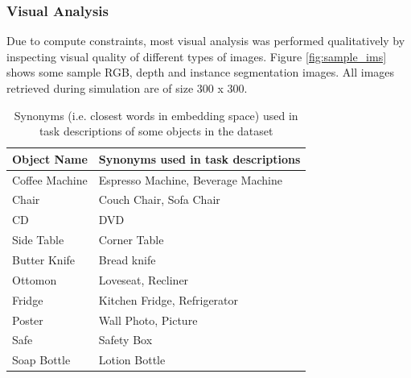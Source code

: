 \documentclass[11pt,a4paper]{article}
\begin{document}
\subsubsection{Visual Analysis}
Due to compute constraints, most visual analysis was performed qualitatively by inspecting visual quality of different types of images. Figure \ref{fig:sample_ims} shows some sample RGB, depth and instance segmentation images. All images retrieved during simulation are of size 300 x 300.



\begin{table}[H]
\small
\begin{tabular}{@{}ll@{}}
\toprule
Object Name & Synonyms used in task descriptions  \\ \midrule
Coffee Machine & Espresso Machine, Beverage Machine \\
Chair & Couch Chair, Sofa Chair \\
CD   & DVD \\
Side Table & Corner Table \\
Butter Knife & Bread knife \\
Ottomon & Loveseat, Recliner \\
Fridge & Kitchen Fridge, Refrigerator \\
Poster & Wall Photo, Picture \\
Safe & Safety Box \\ 
Soap Bottle & Lotion Bottle
\end{tabular}

\caption{Synonyms (i.e. closest words in embedding space) used in task descriptions of some objects in the dataset}
\label{tab:synonynms}
\end{table}
\end{document}
